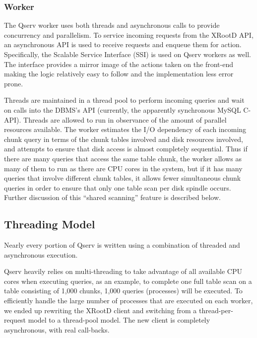\documentclass[DM,lsstdraft,toc]{lsstdoc}
\begin{document}
\subsubsection{Worker}\label{worker}

The Qserv worker uses both threads and asynchronous calls to provide
concurrency and parallelism. To service incoming requests from the
XRootD API, an asynchronous API is used to
receive requests and enqueue them for action. Specifically, the Scalable
Service Interface (SSI) is used on Qserv workers as well. The
interface provides a mirror image of the actions taken on the front-end
making the logic relatively easy to follow and the implementation less
error prone.

Threads are maintained in a thread pool to perform incoming queries and
wait on calls into the DBMS's API (currently, the apparently synchronous
MySQL C-API). Threads are allowed to run in observance of the amount of
parallel resources available. The worker estimates the I/O dependency of
each incoming chunk query in terms of the chunk tables involved and disk
resources involved, and attempts to ensure that disk access is almost
completely sequential. Thus if there are many queries that access the
same table chunk, the worker allows as many of them to run as there are
CPU cores in the system, but if it has many queries that involve
different chunk tables, it allows fewer simultaneous chunk queries in
order to ensure that only one table scan per disk spindle occurs.
Further discussion of this ``shared scanning'' feature is described below.

\subsection{Threading Model}\label{threading-model}

Nearly every portion of Qserv is written using a combination of threaded
and asynchronous execution.

Qserv heavily relies on multi-threading to take advantage of all available CPU
cores when executing queries, as an example, to complete one full table scan
on a table consisting of 1,000 chunks, 1,000 queries (processes) will be
executed. To efficiently handle the large number of processes that are
executed on each worker, we ended up rewriting the XRootD client and switching
from a thread-per-request model to a thread-pool model. The new client is
completely asynchronous, with real call-backs.
\end{document}
